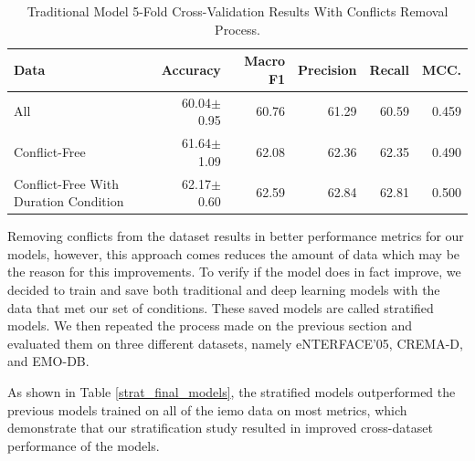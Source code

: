 \begin{table}[H]
	\small
	\centering
	\caption{Traditional Model 5-Fold Cross-Validation Results With Conflicts Removal Process.}
	\label{tab:emo_cat3}
	\centering
	\begin{tabular}{lrrrrr}
		\toprule
		Data   						 	& Accuracy    & Macro F1    & Precision   & Recall      & MCC.       \\
		\midrule
		All		      & 60.04$\pm$0.95 & 60.76 & 61.29 & 60.59 & 0.459 \\
		Conflict-Free & 61.64$\pm$1.09 & 62.08 & 62.36 & 62.35 & 0.490 \\
		Conflict-Free With Duration Condition & 62.17$\pm$0.60 & 62.59 & 62.84 & 62.81 & 0.500 \\
		\bottomrule
	\end{tabular}
\end{table}

Removing conflicts from the dataset results in better performance metrics for our models, however, this approach comes reduces the amount of data which may be the reason for this improvements. To verify if the model does in fact improve, we decided to train and save both traditional and deep learning models with the data that met our set of conditions. These saved models are called stratified models. We then repeated the process made on the previous section and evaluated them on three different datasets, namely eNTERFACE'05, CREMA-D, and EMO-DB.

As shown in Table \ref{strat_final_models}, the stratified models outperformed the previous models trained on all of the \ac{iemo} data on most metrics, which demonstrate that our stratification study resulted in improved cross-dataset performance of the models.

